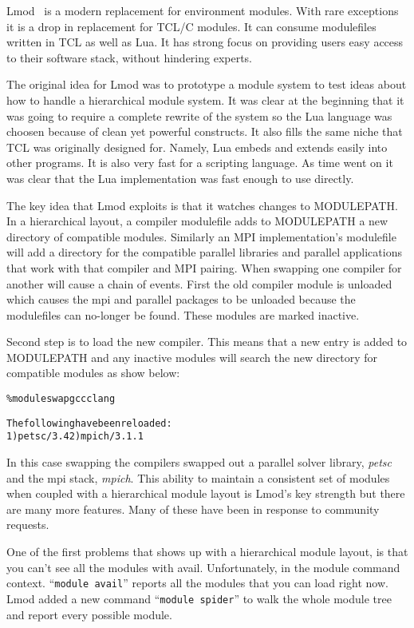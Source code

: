 Lmod~\cite{laytonLmod,taccSecretSauce,taccLmod} is a modern
replacement for environment modules.  With rare exceptions it is a
drop in replacement for TCL/C modules. It can consume modulefiles
written in TCL as well as Lua\cite{LuaBook}.  It has strong focus on
providing users easy access to their software stack, without hindering
experts.  

The original idea for Lmod was to prototype a module system to test
ideas about how to handle a hierarchical module system.  It was clear
at the beginning that it was going to require a complete rewrite of
the system so the Lua language was choosen because of clean yet
powerful constructs.  It also fills the same niche that TCL was
originally designed for.  Namely, Lua embeds and extends easily into
other programs.  It is also very fast for a scripting language.  As
time went on it was clear that the Lua implementation was fast enough
to use directly.  

The key idea that Lmod exploits is that it watches changes to
MODULEPATH.  In a hierarchical layout, a compiler modulefile adds to
MODULEPATH a new directory of compatible modules.  Similarly an MPI
implementation's modulefile will add a directory for the compatible
parallel libraries and parallel applications that work with that
compiler and MPI pairing.  When swapping one compiler for another will
cause a chain of events.  First the old compiler module is unloaded
which causes the mpi and parallel packages to be unloaded because the
modulefiles can no-longer be found.  These modules are marked
inactive.

Second step is to load the new compiler.  This means that a new entry
is added to MODULEPATH and any inactive modules will search the new
directory for compatible modules as show below:
{\small
  \begin{alltt}
    \% module swap gcc clang

    The following have been reloaded:
    1) petsc/3.4  2) mpich/3.1.1
      
\end{alltt}
}
\noindent
In this case swapping the compilers swapped out a parallel solver
library, \emph{petsc} and the mpi stack, \emph{mpich}. This ability
to maintain a consistent set of modules when coupled with a
hierarchical module layout is Lmod's key strength but there are many
more features.  Many of these have been in response to community
requests.  

One of the first problems that shows up with a hierarchical module
layout, is that you can't see all the modules with avail.
Unfortunately, in the module command context.  ``\texttt{module avail}''
reports all the modules that you can load right now.  Lmod added a new
command ``\texttt{module spider}'' to walk the whole module tree and
report every possible module.


